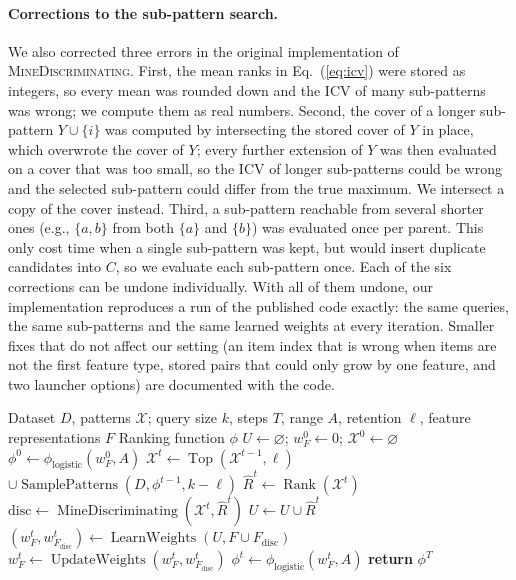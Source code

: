 \documentclass[sigconf]{acmart}
\newcommand{\disc}{\mathrm{disc}}
\begin{document}
\paragraph{Corrections to the sub-pattern search.}
We also corrected three errors in the original implementation of \textsc{MineDiscriminating}. First, the mean ranks in Eq.~(\ref{eq:icv}) were stored as integers, so every mean was rounded down and the ICV of many sub-patterns was wrong; we compute them as real numbers. Second, the cover of a longer sub-pattern $Y\cup\{i\}$ was computed by intersecting the stored cover of $Y$ in place, which overwrote the cover of $Y$; every further extension of $Y$ was then evaluated on a cover that was too small, so the ICV of longer sub-patterns could be wrong and the selected sub-pattern could differ from the true maximum. We intersect a copy of the cover instead. Third, a sub-pattern reachable from several shorter ones (e.g., $\{a,b\}$ from both $\{a\}$ and $\{b\}$) was evaluated once per parent. This only cost time when a single sub-pattern was kept, but would insert duplicate candidates into $C$, so we evaluate each sub-pattern once. Each of the six corrections can be undone individually. With all of them undone, our implementation reproduces a run of the published code exactly: the same queries, the same sub-patterns and the same learned weights at every iteration. Smaller fixes that do not affect our setting (an item index that is wrong when items are not the first feature type, stored pairs that could only grow by one feature, and two launcher options) are documented with the code.

\begin{algorithm}[tb]
\caption{DiSPaLe (Discriminating Sub-Pattern feature Learning)}\label{alg:dispale}
\footnotesize
\begin{algorithmic}[1]
\REQUIRE Dataset $D$, patterns $\mathcal X$; query size $k$, steps $T$, range $A$, retention $\ell$, feature representations $F$
\ENSURE Ranking function $\phi$
\STATE $U\gets\varnothing$; $w_F^0\gets0$; $\mathcal X^0\gets\varnothing$
\STATE $\phi^0\gets\phi_{\mathrm{logistic}}(w_F^0,A)$
  \STATE $\mathcal X^t\gets\operatorname{Top}(\mathcal X^{t-1},\ell)$
  \STATE \hspace{1.35em}$\cup\operatorname{SamplePatterns}(D,\phi^{t-1},k-\ell)$
  \STATE $\hat R^t\gets\operatorname{Rank}(\mathcal X^t)$
  \STATE $\disc\gets\operatorname{MineDiscriminating}(\mathcal X^t,\hat R^t)$
  \STATE $U\gets U\cup\hat R^t$
  \STATE $(w_F^t,w_{F_{\disc}}^t)\gets\operatorname{LearnWeights}(U,F\cup F_{\disc})$
  \STATE $w_F^t\gets\operatorname{UpdateWeights}(w_F^t,w_{F_{\disc}}^t)$
  \STATE $\phi^t\gets\phi_{\mathrm{logistic}}(w_F^t,A)$
\ENDFOR
\STATE \textbf{return} $\phi^T$
\end{algorithmic}
\end{algorithm}
\end{document}
